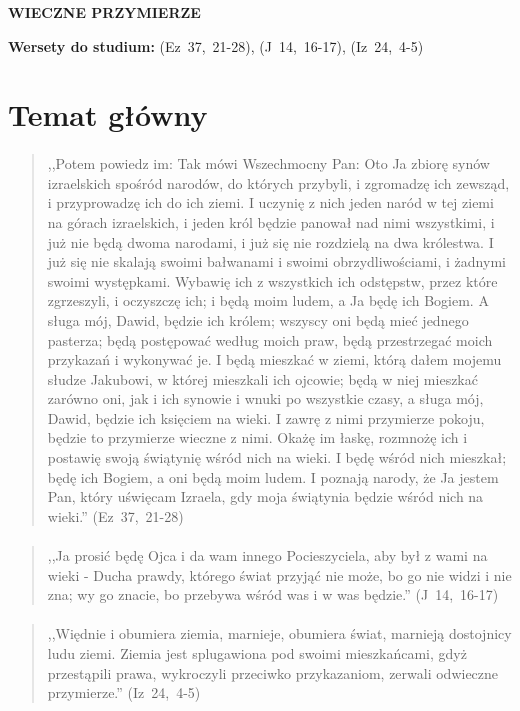 \documentclass[10pt,a4paper,oneside]{article}
\begin{document}
\centerline{\textbf{\MakeUppercase{Wieczne przymierze}}}
\begin{center}
\textbf{Wersety do studium:} 
\mbox{(Ez 37, 21-28)}, \mbox{(J 14, 16-17)}, \mbox{(Iz 24, 4-5)}
\end{center}
\section{Temat główny}
\paragraph{}
\begin{quote}
,,Potem powiedz im: Tak mówi Wszechmocny Pan: Oto Ja zbiorę synów izraelskich spośród narodów, do których przybyli, i zgromadzę ich zewsząd, i przyprowadzę ich do ich ziemi. I uczynię z nich jeden naród w tej ziemi na górach izraelskich, i jeden król będzie panował nad nimi wszystkimi, i już nie będą dwoma narodami, i już się nie rozdzielą na dwa królestwa. I już się nie skalają swoimi bałwanami i swoimi obrzydliwościami, i żadnymi swoimi występkami. Wybawię ich z wszystkich ich odstępstw, przez które zgrzeszyli, i oczyszczę ich; i będą moim ludem, a Ja będę ich Bogiem. A sługa mój, Dawid, będzie ich królem; wszyscy oni będą mieć jednego pasterza; będą postępować według moich praw, będą przestrzegać moich przykazań i wykonywać je. I będą mieszkać w ziemi, którą dałem mojemu słudze Jakubowi, w której mieszkali ich ojcowie; będą w niej mieszkać zarówno oni, jak i ich synowie i wnuki po wszystkie czasy, a sługa mój, Dawid, będzie ich księciem na wieki. I zawrę z nimi przymierze pokoju, będzie to przymierze wieczne z nimi. Okażę im łaskę, rozmnożę ich i postawię swoją świątynię wśród nich na wieki. I będę wśród nich mieszkał; będę ich Bogiem, a oni będą moim ludem. I poznają narody, że Ja jestem Pan, który uświęcam Izraela, gdy moja świątynia będzie wśród nich na wieki.'' \mbox{(Ez 37, 21-28)}
\end{quote}
\paragraph{}
\begin{quote}
,,Ja prosić będę Ojca i da wam innego Pocieszyciela, aby był z wami na wieki - Ducha prawdy, którego świat przyjąć nie może, bo go nie widzi i nie zna; wy go znacie, bo przebywa wśród was i w was będzie.'' \mbox{(J 14, 16-17)}
\end{quote}
\paragraph{}
\begin{quote}
,,Więdnie i obumiera ziemia, marnieje, obumiera świat, marnieją dostojnicy ludu ziemi. Ziemia jest splugawiona pod swoimi mieszkańcami, gdyż przestąpili prawa, wykroczyli przeciwko przykazaniom, zerwali odwieczne przymierze.'' \mbox{(Iz 24, 4-5)}
\end{quote}
\end{document}
